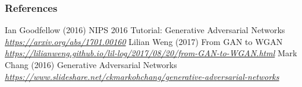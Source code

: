 \begin{vbframe}
\frametitle{References}
\footnotesize{
\begin{thebibliography}{99}
 Ian Goodfellow (2016)
\newblock NIPS 2016 Tutorial: Generative Adversarial Networks
\newblock \emph{\url{https://arxiv.org/abs/1701.00160}}
 Lilian Weng (2017)
\newblock From GAN to WGAN
\newblock \emph{\url{https://lilianweng.github.io/lil-log/2017/08/20/from-GAN-to-WGAN.html}}
 Mark Chang (2016)
\newblock Generative Adversarial Networks
\newblock \emph{\url{https://www.slideshare.net/ckmarkohchang/generative-adversarial-networks}}

\end{thebibliography}}
\end{vbframe}
